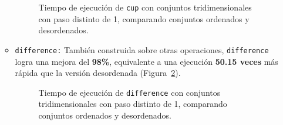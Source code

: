 \begin{itemize}
\begin{itemize}
        \begin{figure}[htbp]
          \centering
          \caption{Tiempo de ejecución de \texttt{cup} con conjuntos tridimensionales con paso distinto de 1, comparando conjuntos ordenados y desordenados.}
          \label{fig:Ren-cup-3d}
        \end{figure}

        \item \texttt{difference:} 
        También construida sobre otras operaciones, \texttt{difference} logra una mejora del \textbf{98\%}, equivalente a una ejecución \textbf{50{.}15 veces} más rápida que la versión desordenada (Figura~\ref{fig:Ren-dif-3d}).

        \begin{figure}[htbp]
          \centering
          \caption{Tiempo de ejecución de \texttt{difference} con conjuntos tridimensionales con paso distinto de 1, comparando conjuntos ordenados y desordenados.}
          \label{fig:Ren-dif-3d}
        \end{figure}


\end{itemize}
\end{itemize}
